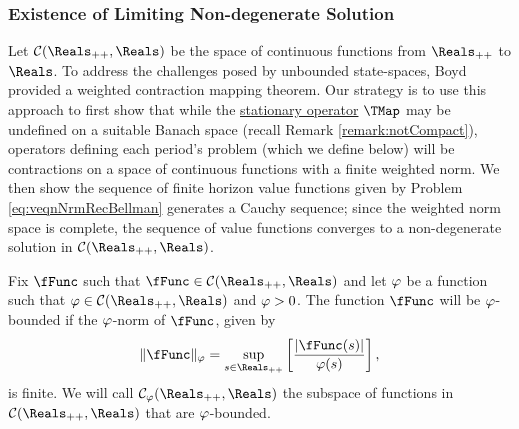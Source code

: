 \documentclass[BufferStockTheory]{subfiles}
\begin{document}

\hypertarget{Conditions-Under-Which-the-Problem-Defines-a-Contraction-Mapping}{}
\subsubsection{Existence of Limiting Non-degenerate Solution}\label{subsubsec:eventuallyCauchy}

Let $\mathcal{C}(\Reals_{++},\Reals)$ be the space of continuous functions from $\Reals_{++}$ to $\Reals$.
To address the challenges posed by unbounded state-spaces, Boyd~\citeyearpar{jboydWeighted} provided a weighted contraction mapping theorem.
Our strategy is to use this approach to first show that while the \hyperlink{Stationary-Bellman-Operator}{stationary operator} $\TMap$ may be undefined on a suitable Banach space (recall Remark \ref{remark:notCompact}), operators defining each period's problem (which we define below) will be contractions on a space of continuous functions with a finite weighted norm.
We then show the sequence of finite horizon value functions given by Problem \eqref{eq:veqnNrmRecBellman} generates a Cauchy sequence; since the weighted norm space is complete, the sequence of value functions converges to a non-degenerate solution in $\mathcal{C}(\Reals_{++},\Reals)$.


\begin{definition}
  Fix $\fFunc$ such that $\fFunc \in \mathcal{C}(\Reals_{++},\Reals)$ and let $\varphi$ be a function such that $\boundFunc\in \mathcal{C}(\Reals_{++},\Reals)$ and $\varphi >0$. The function $\fFunc$ will be $\varphi$-bounded if the $\varphi$-norm of $\fFunc$, given by
  \begin{equation}
    \Vert \fFunc\Vert _{\boundFunc }=\sup_{s\in \Reals_{++}}\left[ \frac{|\fFunc(s)|}{\boundFunc (s)}\right],
    \label{eq:phinorm}
  \end{equation}%
  is finite.
We will call $\mathcal{C}_{\boundFunc}(\Reals_{++},\Reals)$ the subspace of functions in $\mathcal{C}(\Reals_{++},\Reals)$ that are $\varphi$-bounded.
\end{definition}
\end{document}
